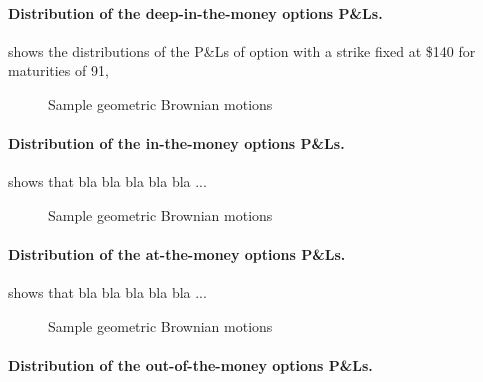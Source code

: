 \documentclass[12pt]{report}
\begin{document}
\paragraph{Distribution of the deep-in-the-money options P\&Ls.}

 shows the distributions of the P\&Ls of option with a strike fixed at \$140 for maturities of 91,  

\begin{figure}[H]
  \centering
  
  \caption{Sample geometric Brownian motions}
  \label{p:analysis:mjd:pl:dist:140}
\end{figure}


\paragraph{Distribution of the in-the-money options P\&Ls.}

 shows that bla bla bla bla bla ...

\begin{figure}[H]
  \centering
  
  \caption{Sample geometric Brownian motions}
  \label{p:analysis:mjd:pl:dist:160}
\end{figure}


\paragraph{Distribution of the at-the-money options P\&Ls.}

 shows that bla bla bla bla bla ...

\begin{figure}[H]
  \centering
  
  \caption{Sample geometric Brownian motions}
  \label{p:analysis:mjd:pl:dist:186}
\end{figure}


\paragraph{Distribution of the out-of-the-money options P\&Ls.}
\end{document}
